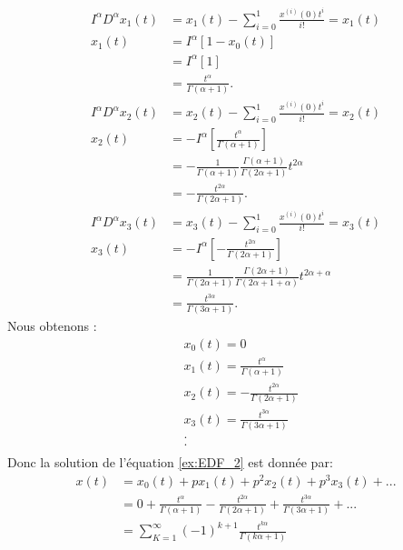 \begin{align*}
    I^{\alpha} D^{\alpha}x_1(t) &= x_1(t) - \sum_{i=0}^1 \frac{x^{(i)}(0) t^i}{i!} = x_1(t)\\
    x_1(t) &= I^{\alpha} \left[1-x_0(t)\right]\\
    &= I^{\alpha} [1]\\
    &= \frac{t^{\alpha}}{\Gamma(\alpha +1)}.
\end{align*}
\begin{align*}
    I^{\alpha} D^{\alpha}x_2(t) &= x_2(t) - \sum_{i=0}^1 \frac{x^{(i)}(0) t^i}{i!} = x_2(t)\\
    x_2(t) &= - I^{\alpha} \left[\frac{t^{\alpha}}{\Gamma(\alpha +1)}\right]\\
    &= -\frac{1}{\Gamma(\alpha +1)} \frac{\Gamma(\alpha+1)}{\Gamma(2\alpha +1)} t^{2\alpha}\\
    & = - \frac{t^{2\alpha}}{\Gamma(2\alpha+1)}.
\end{align*}
\begin{align*}
     I^{\alpha} D^{\alpha}x_3(t) &= x_3(t) - \sum_{i=0}^1 \frac{x^{(i)}(0) t^i}{i!} = x_3(t)\\
    x_3(t) &= - I^{\alpha} \left[ - \frac{t^{2\alpha}}{\Gamma(2\alpha+1)} \right]\\
    &= \frac{1}{\Gamma(2\alpha +1)} \frac{\Gamma(2\alpha+1)}{\Gamma(2\alpha +1 + \alpha)} t^{2\alpha + \alpha}\\
    & = \frac{t^{3\alpha}}{\Gamma(3\alpha+1)}.
\end{align*}
Nous obtenons :
\begin{align*}
    & x_0(t) = 0\\
    & x_1(t) = \frac{t^{\alpha}}{\Gamma(\alpha +1)}\\
    & x_2(t) = -\frac{t^{2\alpha}}{\Gamma(2\alpha +1)}\\
    & x_3(t) = \frac{t^{3\alpha}}{\Gamma(3\alpha+1)}\\
    & . \\
    & . \\
\end{align*}
Donc la solution de l'équation \ref{ex:EDF_2} est donnée par:
\begin{align*}
        x(t) &= x_0(t) + px_1(t) + p^2x_2(t) + p^3x_3(t)+...\\
        & = 0 + \frac{t^{\alpha}}{\Gamma(\alpha +1)} -\frac{t^{2\alpha}}{\Gamma(2\alpha +1)} + \frac{t^{3\alpha}}{\Gamma(3\alpha+1)} +...\\
        &= \sum_{K=1}^{\infty}(-1)^{k+1}\frac{t^{k\alpha}}{\Gamma(k\alpha +1)}
\end{align*}
